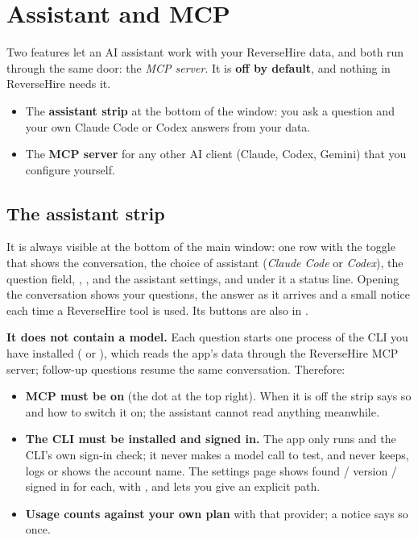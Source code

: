 \chapter{Assistant and MCP}\label{ch:mcp}

Two features let an AI assistant work with your ReverseHire data, and both run through the
same door: the \emph{MCP server}. It is \textbf{off by default}, and nothing in
ReverseHire needs it.
\begin{itemize}
  \item The \textbf{assistant strip} at the bottom of the window: you ask a question and
        your own Claude Code or Codex answers from your data.
  \item The \textbf{MCP server} for any other AI client (Claude, Codex, Gemini) that you
        configure yourself.
\end{itemize}

\section{The assistant strip}
It is always visible at the bottom of the main window: one row with the toggle that shows
the conversation, the choice of assistant (\emph{Claude Code} or \emph{Codex}), the
question field, , ,  and the assistant settings,
and under it a status line. Opening the conversation shows your questions, the answer as
it arrives and a small notice each time a ReverseHire tool is used. Its buttons are
also in .

\textbf{It does not contain a model.} Each question starts one process of the CLI you have
installed ( or ), which reads the app's data through the
ReverseHire MCP server; follow-up questions resume the same conversation. Therefore:
\begin{itemize}
  \item \textbf{MCP must be on} (the dot at the top right). When it is off the strip says
        so and how to switch it on; the assistant cannot read anything meanwhile.
  \item \textbf{The CLI must be installed and signed in.} The app only runs
         and the CLI's own sign-in check; it never makes a model call to
        test, and never keeps, logs or shows the account name. The settings page shows
        found / version / signed in for each, with , and lets you give an
        explicit path.
  \item \textbf{Usage counts against your own plan} with that provider; a notice says so
        once.
\end{itemize}

